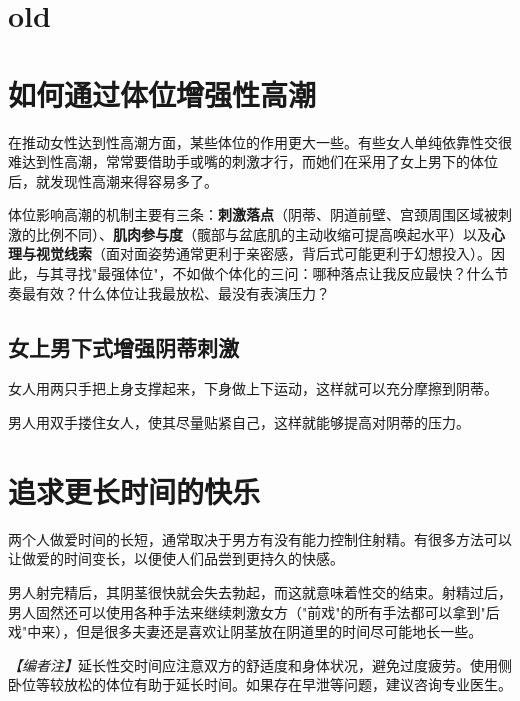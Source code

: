 \documentclass[12pt,UTF8]{ctexbook}
\begin{document}
\section{old}

\section{如何通过体位增强性高潮}

在推动女性达到性高潮方面，某些体位的作用更大一些。有些女人单纯依靠性交很难达到性高潮，常常要借助手或嘴的刺激才行，而她们在采用了女上男下的体位后，就发现性高潮来得容易多了。

\vspace{0.5em}

体位影响高潮的机制主要有三条：\textbf{刺激落点}（阴蒂、阴道前壁、宫颈周围区域被刺激的比例不同）、\textbf{肌肉参与度}（髋部与盆底肌的主动收缩可提高唤起水平）以及\textbf{心理与视觉线索}（面对面姿势通常更利于亲密感，背后式可能更利于幻想投入）。因此，与其寻找"最强体位"，不如做个体化的三问：哪种落点让我反应最快？什么节奏最有效？什么体位让我最放松、最没有表演压力？

\subsection{女上男下式增强阴蒂刺激}

女人用两只手把上身支撑起来，下身做上下运动，这样就可以充分摩擦到阴蒂。

男人用双手搂住女人，使其尽量贴紧自己，这样就能够提高对阴蒂的压力。

\vspace{0.5em}
\section{追求更长时间的快乐}

两个人做爱时间的长短，通常取决于男方有没有能力控制住射精。有很多方法可以让做爱的时间变长，以便使人们品尝到更持久的快感。

男人射完精后，其阴茎很快就会失去勃起，而这就意味着性交的结束。射精过后，男人固然还可以使用各种手法来继续刺激女方（"前戏"的所有手法都可以拿到"后戏"中来），但是很多夫妻还是喜欢让阴茎放在阴道里的时间尽可能地长一些。

\vspace{0.5em}
\noindent\textit{【编者注】}延长性交时间应注意双方的舒适度和身体状况，避免过度疲劳。使用侧卧位等较放松的体位有助于延长时间。如果存在早泄等问题，建议咨询专业医生。

\vspace{0.5em}
\end{document}
